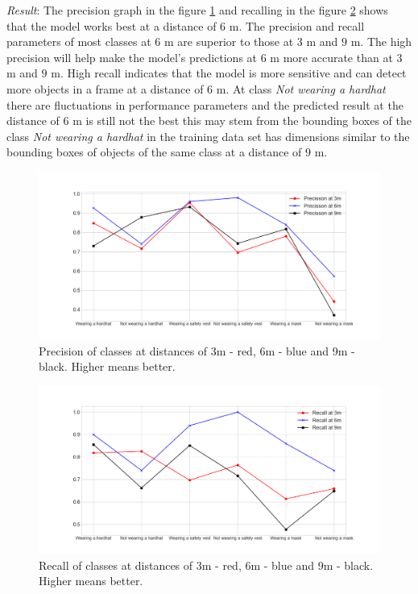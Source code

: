 \documentclass[conference]{IEEEtran}
\begin{document}
\emph{Result}: The precision graph in the figure \ref{fig:3_6_9_precision} and recalling in the figure \ref{fig:3_6_9_recall} shows that the model works best at a distance of $ 6 $ m. The precision and recall parameters of most classes at $ 6 $ m are superior to those at $ 3 $ m and $ 9 $ m. The high precision will help make the model's predictions at $ 6 $ m more accurate than at $ 3 $ m and $ 9 $ m. High recall indicates that the model is more sensitive and can detect more objects in a frame at a distance of $ 6 $ m. At class \emph{Not wearing a hardhat} there are fluctuations in performance parameters and the predicted result at the distance of $ 6 $ m is still not the best this may stem from the bounding boxes of the class \emph{Not wearing a hardhat} in the training data set has dimensions similar to the bounding boxes of objects of the same class at a distance of $ 9 $ m.
\begin{figure}[ht!]
	\centerline{\includegraphics[scale=0.3]{images/3_6_9_precision.png}}
  	\caption{Precision of classes at distances of 3m - red, 6m - blue and 9m - black. Higher means better.}
  	\label{fig:3_6_9_precision}
\end{figure}
\begin{figure}[ht!]
	\centerline{\includegraphics[scale=0.3]{images/3_6_9_recall.png}}
  	\caption{Recall of classes at distances of 3m - red, 6m - blue and 9m - black. Higher means better.}
  	\label{fig:3_6_9_recall}
\end{figure}
\end{document}
